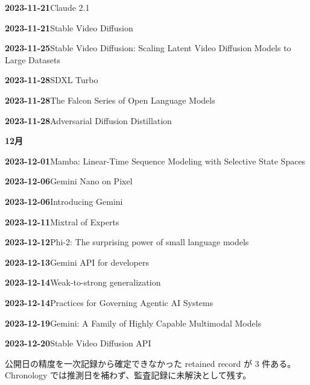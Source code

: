 \noindent\textbf{2023-11-21}\quad Claude 2.1\par
\noindent\textbf{2023-11-21}\quad Stable Video Diffusion\par
\noindent\textbf{2023-11-25}\quad Stable Video Diffusion: Scaling Latent Video Diffusion Models to Large Datasets\par
\noindent\textbf{2023-11-28}\quad SDXL Turbo\par
\noindent\textbf{2023-11-28}\quad The Falcon Series of Open Language Models\par
\noindent\textbf{2023-11-28}\quad Adversarial Diffusion Distillation\par
\medskip
\noindent\textbf{12月}\par
\smallskip
\noindent\textbf{2023-12-01}\quad Mamba: Linear-Time Sequence Modeling with Selective State Spaces\par
\noindent\textbf{2023-12-06}\quad Gemini Nano on Pixel\par
\noindent\textbf{2023-12-06}\quad Introducing Gemini\par
\noindent\textbf{2023-12-11}\quad Mixtral of Experts\par
\noindent\textbf{2023-12-12}\quad Phi-2: The surprising power of small language models\par
\noindent\textbf{2023-12-13}\quad Gemini API for developers\par
\noindent\textbf{2023-12-14}\quad Weak-to-strong generalization\par
\noindent\textbf{2023-12-14}\quad Practices for Governing Agentic AI Systems\par
\noindent\textbf{2023-12-19}\quad Gemini: A Family of Highly Capable Multimodal Models\par
\noindent\textbf{2023-12-20}\quad Stable Video Diffusion API\par
\medskip
\begin{claimboundary}[日付精度の境界]
公開日の精度を一次記録から確定できなかった retained record が 3 件ある。Chronology では推測日を補わず、監査記録に未解決として残す。
\end{claimboundary}
